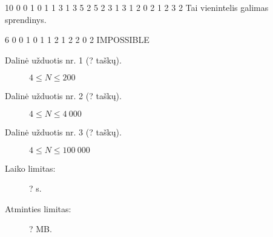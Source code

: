 \documentclass{boi2014-lt}
\begin{document}
    \Examples
	\example
	{
		10
		0 0
		1 0
		1 1
		3 1
		3 5
		2 5
		2 3
		1 3
		1 2
		0 2
	}
	{
		1 2 3 2
	}
	{
		Tai vienintelis galimas sprendinys.
	}

	\example
	{
		6
		0 0
		1 0
		1 1
		2 1
		2 2
		0 2
	}
	{
		IMPOSSIBLE
	}

    \Scoring

    \begin{description}
        \item[Dalinė užduotis nr. 1 (? taškų).] $4 \le N \le 200$
        \item[Dalinė užduotis nr. 2 (? taškų).] $4 \le N \le 4\ 000$
        \item[Dalinė užduotis nr. 3 (? taškų).] $4 \le N \le 100\ 000$
    \end{description}

    \Constraints

    \begin{description}
        \item[Laiko limitas:] ? s.
        \item[Atminties limitas:] ? MB.
    \end{description}
\end{document}
